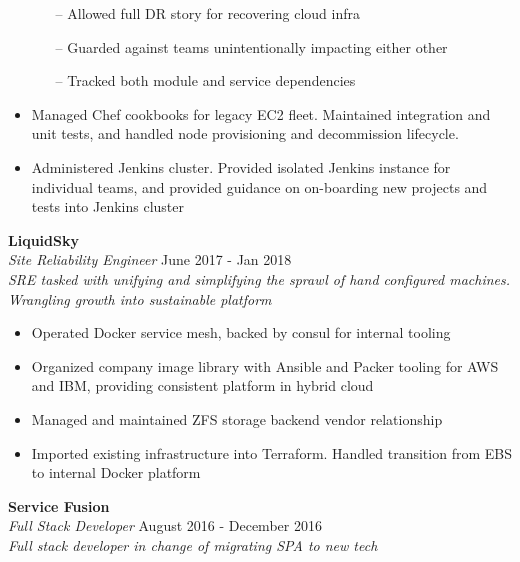 \begin{itemize}
    \begin{itemize}
      \item[--] Allowed full DR story for recovering cloud infra
      \item[--] Guarded against teams unintentionally impacting either other
      \item[--] Tracked both module and service dependencies
    \end{itemize}
  \item Managed Chef cookbooks for legacy EC2 fleet. Maintained integration and unit tests, and handled node provisioning and decommission lifecycle.
  \item Administered Jenkins cluster. Provided isolated Jenkins instance for individual teams, and provided guidance on on-boarding new projects and tests into Jenkins cluster
\end{itemize}

\begin{minipage}{\textwidth}
  \large{\textbf{LiquidSky}} \\
  \textit{Site Reliability Engineer} \hfill June 2017 - Jan 2018 \\[3.75pt]
  \textit{SRE tasked with unifying and simplifying the sprawl of hand configured machines. Wrangling growth into sustainable platform}
\end{minipage}

\begin{itemize}
  \item Operated Docker service mesh, backed by consul for internal tooling
  \item Organized company image library with Ansible and Packer tooling for AWS and IBM, providing consistent platform in hybrid cloud
  \item Managed and maintained ZFS storage backend vendor relationship
  \item Imported existing infrastructure into Terraform. Handled transition from EBS to internal Docker platform
\end{itemize}

\begin{minipage}{\textwidth}
  \large{\textbf{Service Fusion}} \\
  \textit{Full Stack Developer} \hfill August 2016 - December 2016 \\[3.75pt]
  \textit{Full stack developer in change of migrating SPA to new tech}
\end{minipage}

